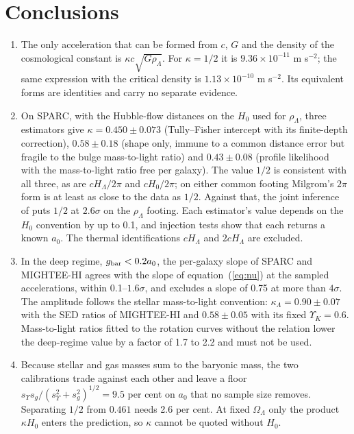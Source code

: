 \documentclass[fleqn,usenatbib]{mnras}
\begin{document}
\section{Conclusions}
\label{sec:conc}
\begin{enumerate}
\item The only acceleration that can be formed from $c$, $G$ and the density of the cosmological constant is $\kappa c\sqrt{G\rho_\Lambda}$. For $\kappa=1/2$ it is $9.36\times10^{-11}$ m s$^{-2}$; the same expression with the critical density is $1.13\times10^{-10}$ m s$^{-2}$. Its equivalent forms are identities and carry no separate evidence.
\item On SPARC, with the Hubble-flow distances on the $H_0$ used for $\rho_\Lambda$, three estimators give $\kappa=0.450\pm0.073$ (Tully--Fisher intercept with its finite-depth correction), $0.58\pm0.18$ (shape only, immune to a common distance error but fragile to the bulge mass-to-light ratio) and $0.43\pm0.08$ (profile likelihood with the mass-to-light ratio free per galaxy). The value $1/2$ is consistent with all three, as are $cH_\Lambda/2\pi$ and $cH_0/2\pi$; on either common footing Milgrom's $2\pi$ form is at least as close to the data as $1/2$. Against that, the joint inference of \citet{Desmond2023} puts $1/2$ at $2.6\sigma$ on the $\rho_\Lambda$ footing. Each estimator's value depends on the $H_0$ convention by up to 0.1, and injection tests show that each returns a known $a_0$. The thermal identifications $cH_\Lambda$ and $2cH_\Lambda$ are excluded.
\item In the deep regime, $g_{\rm bar}<0.2a_0$, the per-galaxy slope of SPARC and MIGHTEE-HI agrees with the slope of equation~(\ref{eq:nu}) at the sampled accelerations, within 0.1--$1.6\sigma$, and excludes a slope of 0.75 at more than $4\sigma$. The amplitude follows the stellar mass-to-light convention: $\kappa_\Lambda=0.90\pm0.07$ with the SED ratios of MIGHTEE-HI and $0.58\pm0.05$ with its fixed $\Upsilon_K=0.6$. Mass-to-light ratios fitted to the rotation curves without the relation lower the deep-regime value by a factor of 1.7 to 2.2 and must not be used.
\item Because stellar and gas masses sum to the baryonic mass, the two calibrations trade against each other and leave a floor $s_\Upsilon s_g/(s_\Upsilon^2+s_g^2)^{1/2}=9.5$ per cent on $a_0$ that no sample size removes. Separating $1/2$ from $0.461$ needs 2.6 per cent. At fixed $\Omega_\Lambda$ only the product $\kappa H_0$ enters the prediction, so $\kappa$ cannot be quoted without $H_0$.

\end{enumerate}
\end{document}
